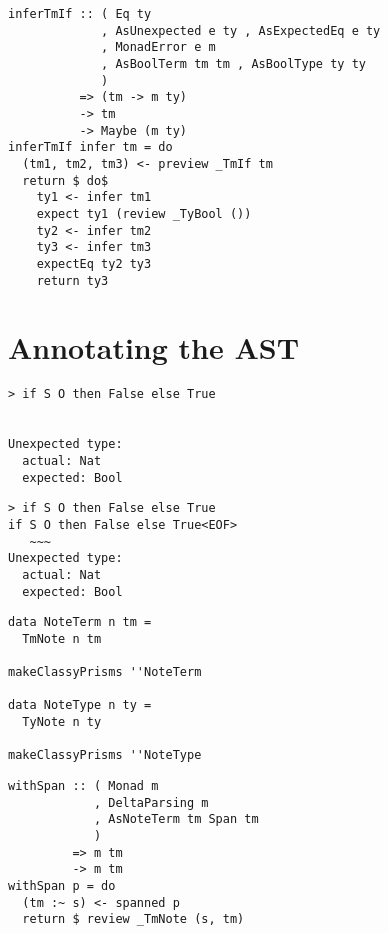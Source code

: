 \documentclass[aspectration=169]{beamer}
\begin{document}
\begin{frame}[fragile]
  \begin{verbatim}
inferTmIf :: ( Eq ty
             , AsUnexpected e ty , AsExpectedEq e ty
             , MonadError e m
             , AsBoolTerm tm tm , AsBoolType ty ty
             )
          => (tm -> m ty)
          -> tm
          -> Maybe (m ty)
inferTmIf infer tm = do
  (tm1, tm2, tm3) <- preview _TmIf tm
  return $ do$
    ty1 <- infer tm1
    expect ty1 (review _TyBool ())
    ty2 <- infer tm2
    ty3 <- infer tm3
    expectEq ty2 ty3
    return ty3
  \end{verbatim}
\end{frame} 

\section{Annotating the AST}

\begin{frame}[fragile]
  \begin{overprint}
\begin{verbatim}
> if S O then False else True


Unexpected type: 
  actual: Nat
  expected: Bool
\end{verbatim}
\begin{verbatim}
> if S O then False else True
if S O then False else True<EOF>
   ~~~
Unexpected type: 
  actual: Nat
  expected: Bool
\end{verbatim}
  \end{overprint}
\end{frame} 

\begin{frame}[fragile]
  \begin{verbatim}
data NoteTerm n tm =
  TmNote n tm

makeClassyPrisms ''NoteTerm

data NoteType n ty =
  TyNote n ty

makeClassyPrisms ''NoteType
  \end{verbatim}
\end{frame} 

\begin{frame}[fragile]
  \begin{verbatim}
withSpan :: ( Monad m
            , DeltaParsing m
            , AsNoteTerm tm Span tm
            )
         => m tm
         -> m tm
withSpan p = do
  (tm :~ s) <- spanned p
  return $ review _TmNote (s, tm)
  \end{verbatim}
\end{frame} 
\end{document}
